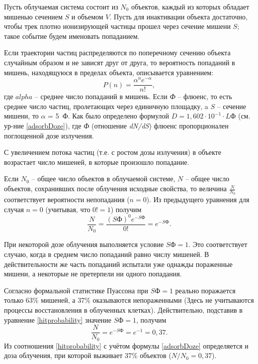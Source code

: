 \documentclass[a4paper, 14pt]{article}
\renewcommand{\emph}[1]{{\color{orange}{\textit{\textbf{#1}}}}}
\begin{document}
Пусть облучаемая система состоит из $N_0$ объектов, каждый из которых обладает
мишенью сечением $S$ и объемом $V$. Пусть для инактивации объекта достаточно, чтобы
трек плотно ионизирующей частицы прошел через сечение мишени $S$; такое событие
будем именовать попаданием.

Если траектории частиц распределяются по поперечному сечению объекта
случайным образом и не зависят друг от друга, то вероятность \emph{одного, двух, ..., n}
попаданий в мишень, находящуюся в пределах объекта, описывается уравнением:
\begin{equation}
    P(n) = \frac{\alpha^ne^{-\alpha}}{n!},
\end{equation}
где $alpha$ – среднее число попаданий в мишень. Если \textit{Ф} – флюенс, то есть
среднее число частиц, пролетающих через единичную площадку, a $S$ – сечение
мишени, то $\alpha$ = 5~Ф. Как было определено формулой $D = 1,602\cdot 10^{-1}\cdot L\text{Ф}$ (см. ур-ние \ref{adsorbDoze}), где \textit{Ф} (отношение \textit{dN/dS}) флюенс пропорционален поглощенной дозе излучения.

С увеличением потока частиц (т.е. с ростом дозы излучения) в объекте
возрастает число мишеней, в которые произошло попадание.

Если $N_0$ – общее число объектов в облучаемой системе, $N$ – общее число
объектов, сохранивших после облучения исходные свойства, то величина $\frac{N}{N_0}$
соответствует вероятности непопадания ($n=0$). Из предыдущего уравнения для случая
$n=0$ (учитывая, что $0! =1$) получим 
\begin{equation} \label{hitProbability}
    \frac{N}{N_0} = \frac{(S\text{Ф})^0 e^{-S\text{Ф}}}{0!} = e^{-S\text{Ф}}.
\end{equation}

При некоторой дозе облучения выполняется условие $S\text{Ф} = 1$. Это соответствует
случаю, когда в среднем число попаданий равно числу мишеней. В действительности
же часть попаданий испытали уже однажды пораженные мишени, а некоторые не
претерпели ни одного попадания.

Согласно формальной статистике Пуассона при $S\text{Ф} = 1$ реально поражается
только 63\% мишеней, а 37\% оказываются непораженными (Здесь не учитываются
процессы восстановления в облученных клетках). Действительно, подставив в
уравнение \ref{hitprobability} значение $S\text{Ф} = 1$, получим
\[ \frac{N}{N_0} = e^{-S\text{Ф}} = e^{-1} = 0,37.\]
Из соотношения \ref{hitprobability} с учётом формулы \ref{adsorbDoze} определяется и доза облучения, при которой выживает 37\% объектов ($N/N_0 =0,37$).
\end{document}
